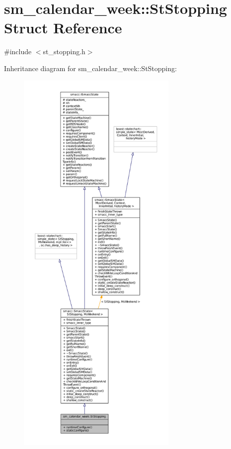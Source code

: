 \hypertarget{structsm__calendar__week_1_1StStopping}{}\section{sm\+\_\+calendar\+\_\+week\+:\+:St\+Stopping Struct Reference}
\label{structsm__calendar__week_1_1StStopping}


{\ttfamily \#include $<$st\+\_\+stopping.\+h$>$}



Inheritance diagram for sm\+\_\+calendar\+\_\+week\+:\+:St\+Stopping\+:
\nopagebreak
\begin{figure}[H]
\begin{center}
\leavevmode
\includegraphics[height=550pt]{structsm__calendar__week_1_1StStopping__inherit__graph}
\end{center}
\end{figure}


